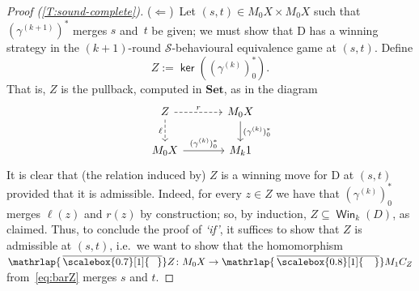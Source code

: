 \documentclass[sigconf,
			final%
			nonacm
                        ]{acmart}
\numberwithin{equation}{section}
\numberwithin{equation}{section}
\theoremstyle{plain}
\theoremstyle{definition}
\newcommand{\overbar}[1]{\mkern 1.5mu\overline{\mkern-2.5mu#1\mkern-1.5mu}\mkern 1.5mu}
\newcommand{\mybar}[3]{%
  \mathrlap{\hspace{#2}\overline{\scalebox{#1}[1]{\hphantom{\ensuremath{#3}}\vphantom{\rule{0pt}{5.5pt}}}}}\ensuremath{#3}
}
\DeclareMathOperator{\Ker}{\mathsf{ker}}
\newcommand{\barM}{\mybar{0.8}{2pt}{M}_1}
\newcommand{\barZ}{\mybar{0.7}{1.75pt}{Z}}
\newcommand{\xra}[1]{\xrightarrow{~#1~}}
\newcommand{\Set}{\mathbf{Set}}
\DeclareMathOperator{\Win}{\mathsf{Win}}
\newcommand{\CalS}{\mathcal{S}}        %
\begin{document}
\begin{proof}[Proof (\cref{T:sound-complete})]
\medskip
\noindent ($\Leftarrow$)~Let $(s,t)\in M_0X\times M_0X$
such that $(\gamma^{(k+1)})^*$ merges $s$ and~$t$ be given; we must
show that D has a winning strategy in the $(k+1)$-round
$\CalS$-behavioural equivalence game at $(s, t)$. Define
\[
Z:= \Ker((\gamma^{(k)})^*_0).
\]
That is, $Z$ is the pullback, computed in $\Set$, as
in the diagram
\[
\begin{tikzcd}[column sep = 35]
  Z \arrow[d, "\ell"', dashed] \arrow[r, "r", dashed]
  &
  M_0X \arrow[d, "(\gamma^{(k)})_0^*"]
  \\
  M_0X \arrow[r, "(\gamma^{(k)})_0^*"]
  &
  M_k1
\end{tikzcd}
\]
It is clear that (the relation induced by) $Z$ is a winning move for D
at $(s, t)$ provided that it is admissible.  Indeed, for every
$z\in Z$ we have that $(\gamma^{(k)})^*_0$ merges $\ell(z)$ and $r(z)$
by construction; so, by induction, $Z\subseteq\Win_{k}(D)$, as
claimed.  Thus, to conclude the proof of \emph{`if'}, it suffices to
show that $Z$ is admissible at $(s, t)$, i.e.~we want to show that the
homomorphism $\barZ\colon M_0 X \to \barM C_Z$ from~\eqref{eq:barZ}
merges $s$ and $t$.


\end{proof}
\end{document}

